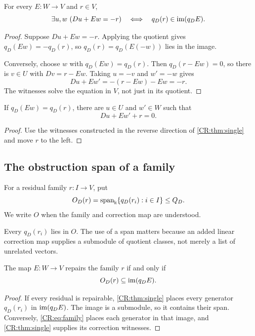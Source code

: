 \begin{CRtheorem}\label{CR:thm:single}
For every $E:W\to V$ and $r\in V$,
\begin{equation}\label{CR:eq:single}
\exists u,w\ (Du+Ew=-r)
\quad\Longleftrightarrow\quad
q_D(r)\in\operatorname{im}(q_DE).
\end{equation}
\end{CRtheorem}
\begin{proof}
Suppose $Du+Ew=-r$. Applying the quotient gives $q_D(Ew)=-q_D(r)$, so $q_D(r)=q_D(E(-w))$ lies in the image.

Conversely, choose $w$ with $q_D(Ew)=q_D(r)$. Then $q_D(r-Ew)=0$, so there is $v\in U$ with $Dv=r-Ew$. Taking $u=-v$ and $w'=-w$ gives
\[
Du+Ew'=-(r-Ew)-Ew=-r.
\]
The witnesses solve the equation in $V$, not just in its quotient.
\end{proof}

\begin{CRcorollary}\label{CR:cor:reconstruct}
If $q_D(Ew)=q_D(r)$, there are $u\in U$ and $w'\in W$ such that
\[
Du+Ew'+r=0.
\]
\end{CRcorollary}
\begin{proof}
Use the witnesses constructed in the reverse direction of \cref{CR:thm:single} and move $r$ to the left.
\end{proof}

\subsection{The obstruction span of a family}
\begin{CRdefinition}\label{CR:def:span}
For a residual family $r:I\to V$, put
\[
O_D(r)=\operatorname{span}_{\Bbbk}\{q_D(r_i):i\in I\}\leq Q_D.
\]
We write $O$ when the family and correction map are understood.
\end{CRdefinition}

Every $q_D(r_i)$ lies in $O$. The use of a span matters because an added linear correction map supplies a submodule of quotient classes, not merely a list of unrelated vectors.

\begin{CRtheorem}\label{CR:thm:family}
The map $E:W\to V$ repairs the family $r$ if and only if
\begin{equation}\label{CR:eq:family}
O_D(r)\subseteq\operatorname{im}(q_DE).
\end{equation}
\end{CRtheorem}
\begin{proof}
If every residual is repairable, \cref{CR:thm:single} places every generator $q_D(r_i)$ in $\operatorname{im}(q_DE)$. The image is a submodule, so it contains their span. Conversely, \eqref{CR:eq:family} places each generator in that image, and \cref{CR:thm:single} supplies its correction witnesses.
\end{proof}

